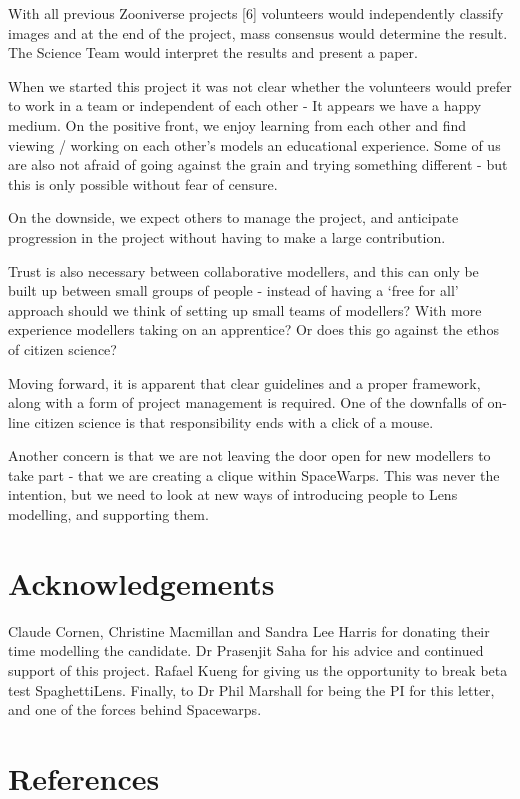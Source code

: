 \documentclass{article}
\begin{document}
With all previous Zooniverse projects {\small{}[6]} volunteers would independently 
classify images and at the end of the project, mass consensus would determine the 
result. The Science Team would interpret the results and present a paper.  

When we started this project it was not clear whether the volunteers would prefer 
to work in a team or independent of each other - It appears we have a happy medium. 
On the positive front, we enjoy learning from each other and find viewing / working 
on each other's models an educational experience. Some of us are also not afraid 
of going against the grain and trying something different - but this is only possible 
without fear of censure. 

On the downside, we expect others to manage the project, and anticipate progression 
in the project without having to make a large contribution. 

Trust is also necessary between collaborative modellers, and this can only be built 
up between small groups of people - instead of having a `free for all' approach 
should we think of setting up small teams of modellers? With more experience modellers 
taking on an apprentice? Or does this go against the ethos of citizen science? 

Moving forward, it is apparent that clear guidelines and a proper framework, along 
with a form of project management is required. One of the downfalls of on-line 
citizen science is that responsibility ends with a click of a mouse. 

Another concern is that we are not leaving the door open for new modellers to take 
part - that we are creating a clique within SpaceWarps. This was never the intention, 
but we need to look at new ways of introducing people to Lens modelling, and supporting 
them.

\section{Acknowledgements}

Claude Cornen, Christine Macmillan and Sandra Lee Harris for donating their time 
modelling the candidate. Dr Prasenjit Saha for his advice and continued support 
of this project. Rafael Kueng for giving us the opportunity to break beta test 
SpaghettiLens. Finally, to Dr Phil Marshall for being the PI for this letter, and 
one of the forces behind Spacewarps.

\section{References}
\end{document}
